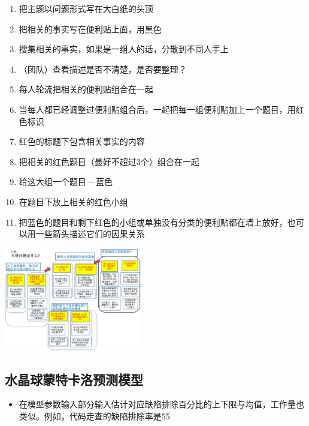 \begin{description}
\item[]
\begin{description}
\tightlist
\item[]
\end{description}
\end{description}

\begin{enumerate}
\tightlist
\item
  把主题以问题形式写在大白纸的头顶
\item
  把相关的事实写在便利贴上面，用黑色
\item
  搜集相关的事实，如果是一组人的话，分散到不同人手上
\item
  （团队）查看描述是否不清楚，是否要整理？
\item
  每人轮流把相关的便利贴组合在一起
\item
  当每人都已经调整过便利贴组合后，一起把每一组便利贴加上一个题目，用红色标识
\item
  红色的标题下包含相关事实的内容
\item
  把相关的红色题目（最好不超过3个）组合在一起
\item
  给这大组一个题目 -- 蓝色
\item
  在题目下放上相关的红色小组
\item
  把蓝色的题目和剩下红色的小组或单独没有分类的便利贴都在墙上放好，也可以用一些箭头描述它们的因果关系

\end{enumerate}


\includegraphics[width=6cm]{KJ_10.png}

\hypertarget{ux6c34ux6676ux7403ux8499ux7279ux5361ux6d1bux9884ux6d4bux6a21ux578b}{%
\subsection{水晶球蒙特卡洛预测模型}\label{ux6c34ux6676ux7403ux8499ux7279ux5361ux6d1bux9884ux6d4bux6a21ux578b}}

\begin{itemize}
\tightlist
\item
  在模型参数输入部分输入估计对应缺陷排除百分比的上下限与均值，工作量也类似。例如，代码走查的缺陷排除率是55%
\end{itemize}

